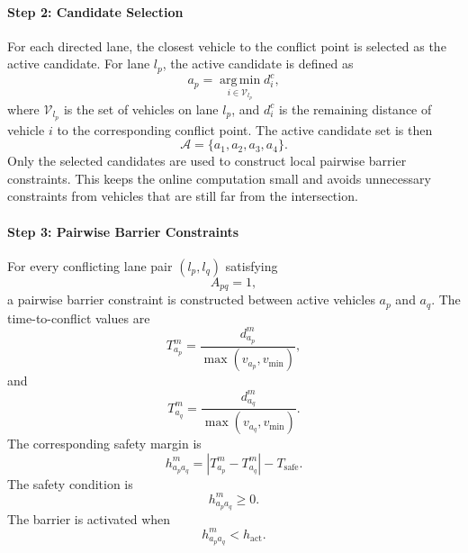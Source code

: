 \documentclass[conference]{IEEEtran}
\begin{document}
\paragraph{Step 2: Candidate Selection}
For each directed lane, the closest vehicle to the conflict point is selected as the active candidate. For lane $l_p$, the active candidate is defined as
\begin{equation}
a_p = \operatorname*{arg\,min}_{i\in \mathcal{V}_{l_p}} d_i^c,
\end{equation}
where $\mathcal{V}_{l_p}$ is the set of vehicles on lane $l_p$, and $d_i^c$ is the remaining distance of vehicle $i$ to the corresponding conflict point. The active candidate set is then
\begin{equation}
\mathcal{A}=\{a_1,a_2,a_3,a_4\}.
\end{equation}
Only the selected candidates are used to construct local pairwise barrier constraints. This keeps the online computation small and avoids unnecessary constraints from vehicles that are still far from the intersection.

\paragraph{Step 3: Pairwise Barrier Constraints}
For every conflicting lane pair $(l_p,l_q)$ satisfying
\begin{equation}
A_{pq}=1,
\end{equation}
a pairwise barrier constraint is constructed between active vehicles $a_p$ and $a_q$. The time-to-conflict values are
\begin{equation}
T_{a_p}^m=\frac{d_{a_p}^m}{\max(v_{a_p},v_{\min})},
\end{equation}
and
\begin{equation}
T_{a_q}^m=\frac{d_{a_q}^m}{\max(v_{a_q},v_{\min})}.
\end{equation}
The corresponding safety margin is
\begin{equation}
h_{a_p a_q}^m
=
|T_{a_p}^m-T_{a_q}^m|
-
T_{\text{safe}}.
\end{equation}
The safety condition is
\begin{equation}
h_{a_p a_q}^m \geq 0.
\end{equation}
The barrier is activated when
\begin{equation}
h_{a_p a_q}^m < h_{\text{act}}.
\end{equation}
\end{document}
